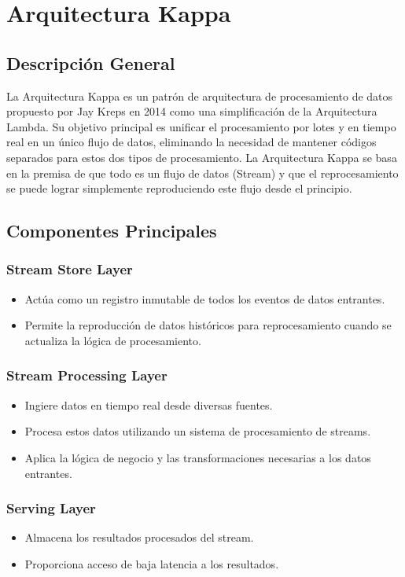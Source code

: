 \section{Arquitectura Kappa}

\subsection{Descripción General}
La Arquitectura Kappa es un patrón de arquitectura de procesamiento de datos propuesto por Jay Kreps en 2014 como una 
simplificación de la Arquitectura Lambda. Su objetivo principal es unificar el procesamiento por lotes y en 
tiempo real en un único flujo de datos, eliminando la necesidad de mantener códigos separados para estos dos tipos de procesamiento. 
La Arquitectura Kappa se basa en la premisa de que todo es un flujo de datos (Stream) y que el reprocesamiento 
se puede lograr simplemente reproduciendo este flujo desde el principio.

\subsection{Componentes Principales}

\subsubsection{Stream Store Layer}
\begin{itemize}
    \item Actúa como un registro inmutable de todos los eventos de datos entrantes.
    \item Permite la reproducción de datos históricos para reprocesamiento cuando se actualiza la lógica de procesamiento.
\end{itemize}

\subsubsection{Stream Processing Layer}
\begin{itemize}
    \item Ingiere datos en tiempo real desde diversas fuentes.
    \item Procesa estos datos utilizando un sistema de procesamiento de streams.
    \item Aplica la lógica de negocio y las transformaciones necesarias a los datos entrantes.
\end{itemize}

\subsubsection{Serving Layer}
\begin{itemize}
    \item Almacena los resultados procesados del stream.
    \item Proporciona acceso de baja latencia a los resultados.
\end{itemize}

